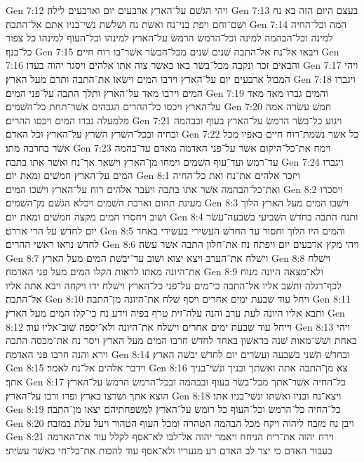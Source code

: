 Gen 7:12  ויהי הגשׁם על־הארץ ארבעים יום וארבעים לילה׃
Gen 7:13  בעצם היום הזה בא נח ושׁם־וחם ויפת בני־נח ואשׁת נח ושׁלשׁת נשׁי־בניו אתם אל־התבה׃
Gen 7:14  המה וכל־החיה למינה וכל־הבהמה למינה וכל־הרמשׂ הרמשׂ על־הארץ למינהו וכל־העוף למינהו כל צפור כל־כנף׃
Gen 7:15  ויבאו אל־נח אל־התבה שׁנים שׁנים מכל־הבשׂר אשׁר־בו רוח חיים׃
Gen 7:16  והבאים זכר ונקבה מכל־בשׂר באו כאשׁר צוה אתו אלהים ויסגר יהוה בעדו׃
Gen 7:17  ויהי המבול ארבעים יום על־הארץ וירבו המים וישׂאו את־התבה ותרם מעל הארץ׃
Gen 7:18  ויגברו המים וירבו מאד על־הארץ ותלך התבה על־פני המים׃
Gen 7:19  והמים גברו מאד מאד על־הארץ ויכסו כל־ההרים הגבהים אשׁר־תחת כל־השׁמים׃
Gen 7:20  חמשׁ עשׂרה אמה מלמעלה גברו המים ויכסו ההרים׃
Gen 7:21  ויגוע כל־בשׂר הרמשׂ על־הארץ בעוף ובבהמה ובחיה ובכל־השׁרץ השׁרץ על־הארץ וכל האדם׃
Gen 7:22  כל אשׁר נשׁמת־רוח חיים באפיו מכל אשׁר בחרבה מתו׃
Gen 7:23  וימח את־כל־היקום אשׁר על־פני האדמה מאדם עד־בהמה עד־רמשׂ ועד־עוף השׁמים וימחו מן־הארץ וישׁאר אך־נח ואשׁר אתו בתבה׃
Gen 7:24  ויגברו המים על־הארץ חמשׁים ומאת יום׃
Gen 8:1  ויזכר אלהים את־נח ואת כל־החיה ואת־כל־הבהמה אשׁר אתו בתבה ויעבר אלהים רוח על־הארץ וישׁכו המים׃
Gen 8:2  ויסכרו מעינת תהום וארבת השׁמים ויכלא הגשׁם מן־השׁמים׃
Gen 8:3  וישׁבו המים מעל הארץ הלוך ושׁוב ויחסרו המים מקצה חמשׁים ומאת יום׃
Gen 8:4  ותנח התבה בחדשׁ השׁביעי בשׁבעה־עשׂר יום לחדשׁ על הרי אררט׃
Gen 8:5  והמים היו הלוך וחסור עד החדשׁ העשׂירי בעשׂירי באחד לחדשׁ נראו ראשׁי ההרים׃
Gen 8:6  ויהי מקץ ארבעים יום ויפתח נח את־חלון התבה אשׁר עשׂה׃
Gen 8:7  וישׁלח את־הערב ויצא יצוא ושׁוב עד־יבשׁת המים מעל הארץ׃
Gen 8:8  וישׁלח את־היונה מאתו לראות הקלו המים מעל פני האדמה׃
Gen 8:9  ולא־מצאה היונה מנוח לכף־רגלה ותשׁב אליו אל־התבה כי־מים על־פני כל־הארץ וישׁלח ידו ויקחה ויבא אתה אליו אל־התבה׃
Gen 8:10  ויחל עוד שׁבעת ימים אחרים ויסף שׁלח את־היונה מן־התבה׃
Gen 8:11  ותבא אליו היונה לעת ערב והנה עלה־זית טרף בפיה וידע נח כי־קלו המים מעל הארץ׃
Gen 8:12  וייחל עוד שׁבעת ימים אחרים וישׁלח את־היונה ולא־יספה שׁוב־אליו עוד׃
Gen 8:13  ויהי באחת ושׁשׁ־מאות שׁנה בראשׁון באחד לחדשׁ חרבו המים מעל הארץ ויסר נח את־מכסה התבה וירא והנה חרבו פני האדמה׃
Gen 8:14  ובחדשׁ השׁני בשׁבעה ועשׂרים יום לחדשׁ יבשׁה הארץ׃
Gen 8:15  וידבר אלהים אל־נח לאמר׃
Gen 8:16  צא מן־התבה אתה ואשׁתך ובניך ונשׁי־בניך אתך׃
Gen 8:17  כל־החיה אשׁר־אתך מכל־בשׂר בעוף ובבהמה ובכל־הרמשׂ הרמשׂ על־הארץ הוצא אתך ושׁרצו בארץ ופרו ורבו על־הארץ׃
Gen 8:18  ויצא־נח ובניו ואשׁתו ונשׁי־בניו אתו׃
Gen 8:19  כל־החיה כל־הרמשׂ וכל־העוף כל רומשׂ על־הארץ למשׁפחתיהם יצאו מן־התבה׃
Gen 8:20  ויבן נח מזבח ליהוה ויקח מכל הבהמה הטהרה ומכל העוף הטהור ויעל עלת במזבח׃
Gen 8:21  וירח יהוה את־ריח הניחח ויאמר יהוה אל־לבו לא־אסף לקלל עוד את־האדמה בעבור האדם כי יצר לב האדם רע מנעריו ולא־אסף עוד להכות את־כל־חי כאשׁר עשׂיתי׃
